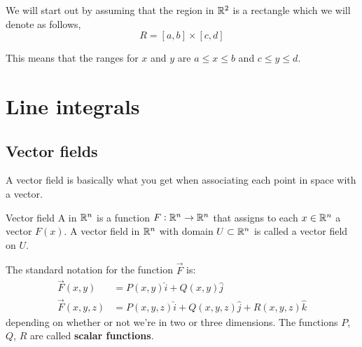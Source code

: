 We will start out by assuming that the region in $\mathbb R^2$ is a rectangle which we will denote as follows,
\[ R=[a,b]\times[c,d] \]

This means that the ranges for $x$ and $y$ are $a \le x \le b$ and $c \le y \le d$.

\pagebreak

\section{Line integrals}
\subsection{Vector fields}
A vector field is basically what you get when associating each point in space with a vector.

\begin{defn}{Vector field}{}
A  in $\mathbb R^n$ is a function $F : \mathbb R^n \to  \mathbb R^n$ that assigns to each $x \in \mathbb R^n$ a vector $F(x)$. A vector field in $\mathbb R^n$ with domain $U \subset \mathbb R^n$ is called a vector field on $U$.
\end{defn}

The standard notation for the function $\vec{F}$ is:
\begin{align*}
\vec{F}(x,y) &= P(x,y)\hat{i} + Q(x,y)\hat{j} \\
\vec{F}(x,y,z) &= P(x,y,z)\hat{i} + Q(x,y,z)\hat{j} + R(x,y,z)\hat{k}
\end{align*}
depending on whether or not we're in two or three dimensions. The functions $P$, $Q$, $R$ are called \textbf{scalar functions}.

